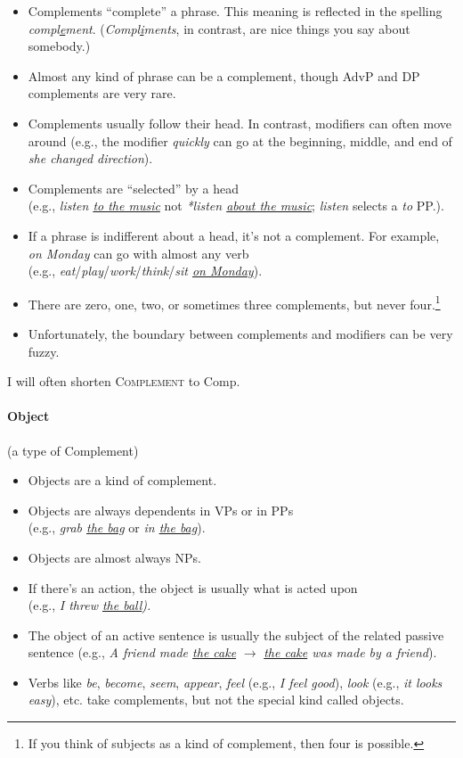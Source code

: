 \begin{itemize}[noitemsep]
    \item {}Complements ``complete'' a phrase. This meaning is reflected in the spelling \textit{compl\uline{e}ment}. (\textit{Compl\uline{i}ments}, in contrast, are nice things you say about somebody.)
    \item Almost any kind of phrase can be a complement, though AdvP and DP complements are very rare.
    \item Complements usually follow their head. In contrast, modifiers can often move around (e.g., the modifier \textit{quickly} can go at the beginning, middle, and end of \textit{she changed direction}).
    \item Complements are ``selected'' by a head \\(e.g., \textit{listen \uline{to the music}} not \textit{*listen \uline{about the music}}; \textit{listen} selects a \textit{to} PP.).
    \item If a phrase is indifferent about a head, it's not a complement. For example, \textit{on Monday} can go with almost any verb \\(e.g., \textit{eat}/\textit{play}/\textit{work}/\textit{think}/\textit{sit \uline{on Monday}}).
    \item There are zero, one, two, or sometimes three complements, but never four.\footnote{If you think of subjects as a kind of complement, then four is possible.}
    \item Unfortunately, the boundary between complements and modifiers can be very fuzzy.
\end{itemize}

I will often shorten \textsc{Complement} to Comp.

\paragraph*{Object} \label{sec:object} (a type of Complement)

\begin{itemize}[noitemsep]
    \item {}Objects are a kind of complement.
    \item Objects are always dependents in VPs or in PPs \\(e.g., \textit{grab \uline{the bag}} or \textit{in \uline{the bag}}).
    \item Objects are almost always NPs.
    \item If there's an action, the object is usually what is acted upon \\(e.g., \textit{I threw \uline{the ball}).}
    \item The object of an active sentence is usually the subject of the related passive sentence (e.g., \textit{A friend made \uline{the cake}} $\rightarrow$ \textit{\uline{the cake} was made by a friend}).
    \item Verbs like \textit{be},\textit{ become},\textit{ seem},\textit{ appear},\textit{ feel} (e.g., \textit{I feel good}), \textit{look} (e.g., \textit{it looks easy}), etc. take complements, but not the special kind called objects.
\end{itemize}

